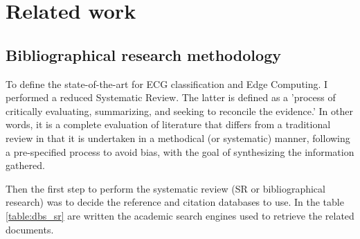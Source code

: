 \chapter{Related work} \label{chap3}

\section{Bibliographical research methodology} \label{3biblio_research}

To define the state-of-the-art for ECG classification and Edge Computing. I performed a reduced Systematic Review. The latter is defined as \cite{systematic_review} a 'process of critically evaluating, summarizing, and seeking to reconcile the evidence.' In other words, it is a complete evaluation of literature that differs from a traditional review in that it is undertaken in a methodical (or systematic) manner, following a pre-specified process to avoid bias, with the goal of synthesizing the information gathered. 

Then the first step to perform the systematic review (SR or bibliographical research) was to decide the reference and citation databases to use. In the table \ref{table:dbs_sr} are written the academic search engines used to retrieve the related documents.

